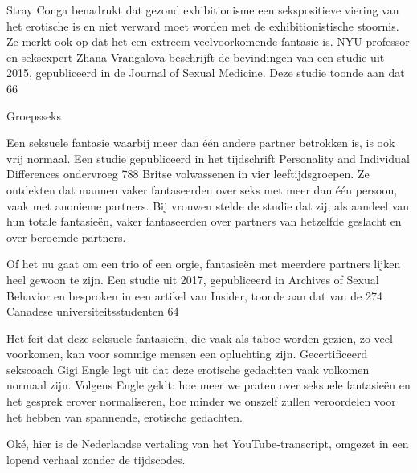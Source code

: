 Stray Conga benadrukt dat gezond exhibitionisme een sekspositieve viering van het erotische is en niet verward moet worden met de exhibitionistische stoornis. Ze merkt ook op dat het een extreem veelvoorkomende fantasie is. NYU-professor en seksexpert Zhana Vrangalova beschrijft de bevindingen van een studie uit 2015, gepubliceerd in de Journal of Sexual Medicine. Deze studie toonde aan dat 66 %

Groepsseks

Een seksuele fantasie waarbij meer dan één andere partner betrokken is, is ook vrij normaal. Een studie gepubliceerd in het tijdschrift Personality and Individual Differences ondervroeg 788 Britse volwassenen in vier leeftijdsgroepen. Ze ontdekten dat mannen vaker fantaseerden over seks met meer dan één persoon, vaak met anonieme partners. Bij vrouwen stelde de studie dat zij, als aandeel van hun totale fantasieën, vaker fantaseerden over partners van hetzelfde geslacht en over beroemde partners.

Of het nu gaat om een trio of een orgie, fantasieën met meerdere partners lijken heel gewoon te zijn. Een studie uit 2017, gepubliceerd in Archives of Sexual Behavior en besproken in een artikel van Insider, toonde aan dat van de 274 Canadese universiteitsstudenten 64 %

Het feit dat deze seksuele fantasieën, die vaak als taboe worden gezien, zo veel voorkomen, kan voor sommige mensen een opluchting zijn. Gecertificeerd sekscoach Gigi Engle legt uit dat deze erotische gedachten vaak volkomen normaal zijn. Volgens Engle geldt: hoe meer we praten over seksuele fantasieën en het gesprek erover normaliseren, hoe minder we onszelf zullen veroordelen voor het hebben van spannende, erotische gedachten.

Oké, hier is de Nederlandse vertaling van het YouTube-transcript, omgezet in een lopend verhaal zonder de tijdscodes.

